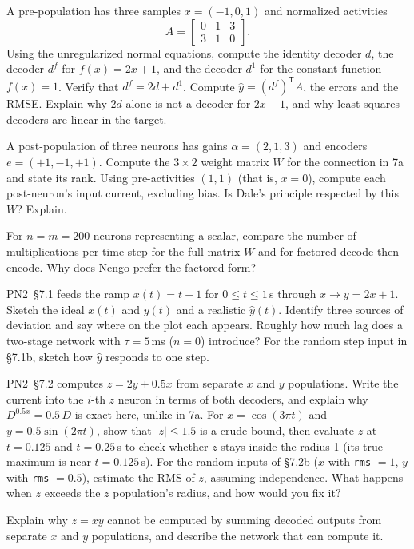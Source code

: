 \documentclass[10pt,letterpaper]{article}
\newcommand{\T}{\mathsf{T}}
\begin{document}
\begin{parts}
\item[7a.] A pre-population has three samples $x = (-1, 0, 1)$ and normalized activities
\[
A = \begin{bmatrix} 0 & 1 & 3 \\ 3 & 1 & 0 \end{bmatrix}.
\]
Using the unregularized normal equations, compute the identity decoder $d$, the decoder $d^{f}$ for $f(x) = 2x + 1$, and the decoder $d^{1}$ for the constant function $f(x) = 1$. Verify that $d^{f} = 2d + d^{1}$. Compute $\hat y = (d^f)^\T A$, the errors and the RMSE. Explain why $2d$ alone is not a decoder for $2x + 1$, and why least-squares decoders are linear in the target.

\item[7b.] A post-population of three neurons has gains $\alpha = (2, 1, 3)$ and encoders $e = (+1, -1, +1)$. Compute the $3 \times 2$ weight matrix $W$ for the connection in 7a and state its rank. Using pre-activities $(1, 1)$ (that is, $x = 0$), compute each post-neuron's input current, excluding bias. Is Dale's principle respected by this $W$? Explain.

\item[7c.] For $n = m = 200$ neurons representing a scalar, compare the number of multiplications per time step for the full matrix $W$ and for factored decode-then-encode. Why does Nengo prefer the factored form?

\item[7d.] PN2~\S7.1 feeds the ramp $x(t) = t - 1$ for $0 \le t \le 1$\,s through $x \to y = 2x + 1$. Sketch the ideal $x(t)$ and $y(t)$ and a realistic $\hat y(t)$. Identify three sources of deviation and say where on the plot each appears. Roughly how much lag does a two-stage network with $\tau = 5$\,ms ($n = 0$) introduce? For the random step input in \S7.1b, sketch how $\hat y$ responds to one step.

\item[7e.] PN2~\S7.2 computes $z = 2y + 0.5x$ from separate $x$ and $y$ populations. Write the current into the $i$-th $z$ neuron in terms of both decoders, and explain why $D^{0.5x} = 0.5\,D$ is exact here, unlike in 7a. For $x = \cos(3\pi t)$ and $y = 0.5\sin(2\pi t)$, show that $|z| \le 1.5$ is a crude bound, then evaluate $z$ at $t = 0.125$ and $t = 0.25$\,s to check whether $z$ stays inside the radius 1 (its true maximum is near $t = 0.125$\,s). For the random inputs of \S7.2b ($x$ with \texttt{rms} $= 1$, $y$ with \texttt{rms} $= 0.5$), estimate the RMS of $z$, assuming independence. What happens when $z$ exceeds the $z$ population's radius, and how would you fix it?

\item[7f.] Explain why $z = xy$ cannot be computed by summing decoded outputs from separate $x$ and $y$ populations, and describe the network that can compute it.
\end{parts}
\end{document}
